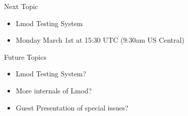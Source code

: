 \documentclass{beamer}
\begin{document}
\begin{frame}{Next Topic}
  \begin{itemize}
    \item Lmod Testing System
    \item Monday March 1st at 15:30 UTC (9:30am US Central)
  \end{itemize}
\end{frame}

\begin{frame}{Future Topics}
  \begin{itemize}
    \item Lmod Testing System?
    \item More internals of Lmod?
    \item Guest Presentation of special issues?
  \end{itemize}
\end{frame}
\end{document}
